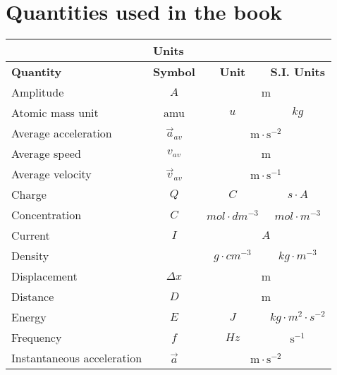 \section{Quantities used in the book}
\begin{table}[H]
\begin{center}
\begin{tabular}{|l|c|c|c|}\hline \hline 
\multicolumn{4}{|c|}{\textbf{Units}}\\ \hline \hline
\textbf{Quantity}          & \textbf{Symbol} & \textbf{Unit}           & \textbf{S.I. Units}        \\ \hline
Amplitude                  & $A$             & \multicolumn{2}{c|}{m}                               \\ \hline
Atomic mass unit           & amu               & $u$                     & $kg$                       \\ \hline
Average acceleration       & $\vec{a}_{av}$  & \multicolumn{2}{c|}{$\text{m} \cdot \text{s}^{-2}$}  \\ \hline
Average speed              & $v_{av}$        & \multicolumn{2}{c|}{m}                               \\ \hline
Average velocity           & $\vec{v}_{av}$  & \multicolumn{2}{c|}{$\text{m} \cdot \text{s}^{-1}$}  \\ \hline
Charge                     & $Q$             & $C$                     & $s \cdot A$                \\ \hline
Concentration              & $C$             & $mol \cdot dm^{-3}$     & $mol \cdot m^{-3}$         \\ \hline
Current                    & $I$             & \multicolumn{2}{c|}{$A$}                             \\ \hline
Density                    &                 & $g \cdot cm^{-3}$       & $kg \cdot m^{-3}$          \\ \hline
Displacement               & $\Delta x$      & \multicolumn{2}{c|}{m}                               \\ \hline
Distance                   & $D$             & \multicolumn{2}{c|}{m}                               \\ \hline
Energy                     & $E$             & $J$                     & $kg \cdot m^{2} \cdot s^{-2}$  \\ \hline
Frequency                  & $f$             & $Hz$ & $\text{s}^{-1}$                               \\ \hline
Instantaneous acceleration & $\vec{a}$       & \multicolumn{2}{c|}{$\text{m} \cdot \text{s}^{-2}$}  \\ \hline

\end{tabular}
\end{center}
\end{table}
